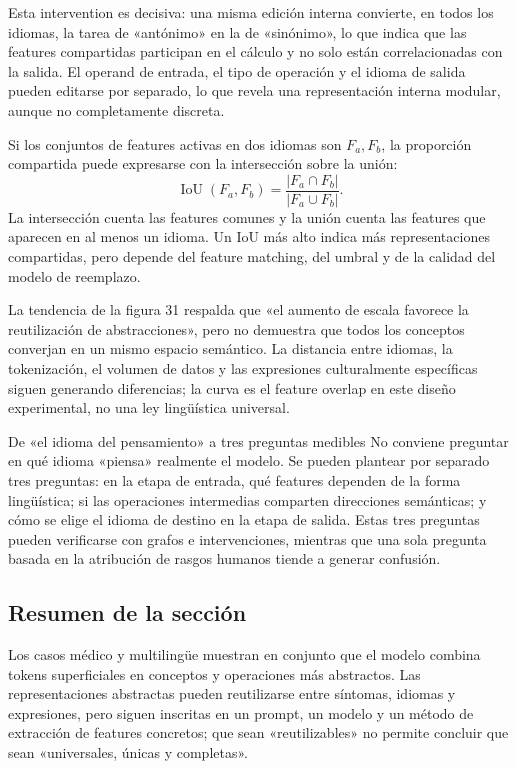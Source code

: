
Esta intervention es decisiva: una misma edición interna convierte, en todos los idiomas, la tarea de «antónimo» en la de «sinónimo», lo que indica que las features compartidas participan en el cálculo y no solo están correlacionadas con la salida. El operand de entrada, el tipo de operación y el idioma de salida pueden editarse por separado, lo que revela una representación interna modular, aunque no completamente discreta.

Si los conjuntos de features activas en dos idiomas son $F_a,F_b$, la proporción compartida puede expresarse con la intersección sobre la unión:
\[
\operatorname{IoU}(F_a,F_b)=\frac{|F_a\cap F_b|}{|F_a\cup F_b|}.
\]
La intersección cuenta las features comunes y la unión cuenta las features que aparecen en al menos un idioma. Un IoU más alto indica más representaciones compartidas, pero depende del feature matching, del umbral y de la calidad del modelo de reemplazo.


La tendencia de la figura 31 respalda que «el aumento de escala favorece la reutilización de abstracciones», pero no demuestra que todos los conceptos converjan en un mismo espacio semántico. La distancia entre idiomas, la tokenización, el volumen de datos y las expresiones culturalmente específicas siguen generando diferencias; la curva es el feature overlap en este diseño experimental, no una ley lingüística universal.

\begin{knowledgebox}{De «el idioma del pensamiento» a tres preguntas medibles}
No conviene preguntar en qué idioma «piensa» realmente el modelo. Se pueden plantear por separado tres preguntas: en la etapa de entrada, qué features dependen de la forma lingüística; si las operaciones intermedias comparten direcciones semánticas; y cómo se elige el idioma de destino en la etapa de salida. Estas tres preguntas pueden verificarse con grafos e intervenciones, mientras que una sola pregunta basada en la atribución de rasgos humanos tiende a generar confusión.
\end{knowledgebox}

\subsection{Resumen de la sección}

Los casos médico y multilingüe muestran en conjunto que el modelo combina tokens superficiales en conceptos y operaciones más abstractos. Las representaciones abstractas pueden reutilizarse entre síntomas, idiomas y expresiones, pero siguen inscritas en un prompt, un modelo y un método de extracción de features concretos; que sean «reutilizables» no permite concluir que sean «universales, únicas y completas».
